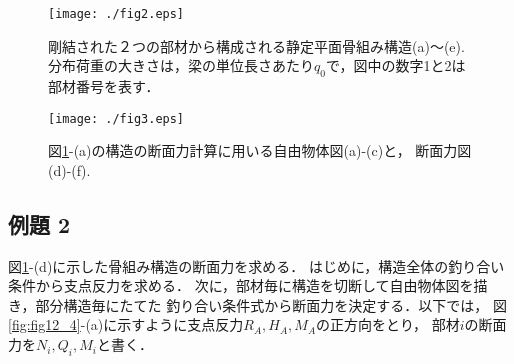 \documentclass[10pt,a4j]{jarticle}
\begin{document}
\begin{figure}[h]
	\begin{center}
	\texttt{[image: ./fig2.eps]} 
	\end{center}
	\caption{
		剛結された２つの部材から構成される静定平面骨組み構造(a)〜(e). 
		分布荷重の大きさは，梁の単位長さあたり$q_0$で，図中の数字1と2は部材番号を表す．
	} 
	\label{fig:fig12_2}
\end{figure}
\begin{figure}[h]
	\begin{center}
	\texttt{[image: ./fig3.eps]} 
	\end{center}
	\caption{
		図\ref{fig:fig12_2}-(a)の構造の断面力計算に用いる自由物体図(a)-(c)と，
		断面力図(d)-(f).
	} 
	\label{fig:fig12_3}
\end{figure}
\subsection{例題 2}
図\ref{fig:fig12_2}-(d)に示した骨組み構造の断面力を求める．
はじめに，構造全体の釣り合い条件から支点反力を求める．
次に，部材毎に構造を切断して自由物体図を描き，部分構造毎にたてた
釣り合い条件式から断面力を決定する．以下では，
図\ref{fig:fig12_4}-(a)に示すように支点反力$R_A,H_A,M_A$の正方向をとり，
部材$i$の断面力を$N_i, Q_i, M_i$と書く．
\end{document}
